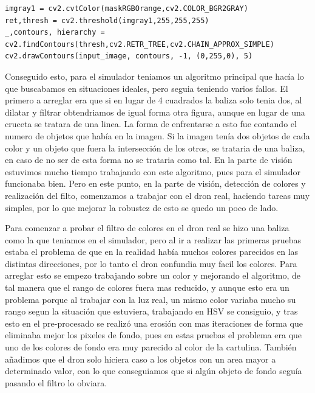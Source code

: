 \begin{verbatim}
imgray1 = cv2.cvtColor(maskRGBOrange,cv2.COLOR_BGR2GRAY)
ret,thresh = cv2.threshold(imgray1,255,255,255)
_,contours, hierarchy = cv2.findContours(thresh,cv2.RETR_TREE,cv2.CHAIN_APPROX_SIMPLE)
cv2.drawContours(input_image, contours, -1, (0,255,0), 5)
\end{verbatim}

\hspace{1cm}Conseguido esto, para el simulador teniamos un algoritmo principal que hac\'ia lo que buscabamos en situaciones ideales, pero seguia teniendo varios fallos.
\hspace{1cm} El primero a arreglar era que si en lugar de 4 cuadrados la baliza solo tenia dos, al dilatar y filtrar obtendriamos de igual forma otra figura, aunque en lugar de una cruceta se tratara de una linea. La forma de enfrentarse a esto fue contando el numero de objetos que hab\'ia en la imagen. Si la imagen ten\'ia dos objetos de cada color y un objeto que fuera la intersecci\'on de los otros, se trataria de una baliza, en caso de no ser de esta forma no se trataria como tal. En la parte de visi\'on estuvimos mucho tiempo trabajando con este algoritmo, pues para el simulador funcionaba bien. Pero en este punto, en la parte de visi\'on, detecci\'on de colores y realizaci\'on del filto, comenzamos a trabajar con el dron real, haciendo tareas muy simples, por lo que mejorar la robustez de esto se quedo un poco de lado. 

\hspace{1cm} Para comenzar a probar el filtro de colores en el dron real se hizo una baliza como la que teniamos en el simulador, pero al ir a realizar las primeras pruebas estaba el problema de que en la realidad hab\'ia muchos colores parecidos en las distintas direcciones, por lo tanto el dron confundia muy facil los colores. Para arreglar esto se empezo trabajando sobre un color y mejorando el algoritmo, de tal manera que el rango de colores fuera mas reducido, y aunque esto era un problema porque al trabajar con la luz real, un mismo color variaba mucho su rango segun la situaci\'on que estuviera, trabajando en HSV se consiguio, y tras esto en el pre-procesado se realiz\'o una erosi\'on con mas iteraciones de forma que eliminaba mejor los pixeles de fondo, pues en estas pruebas el problema era que uno de los colores de fondo era muy parecido al color de la cartulina. Tambi\'en añadimos que el dron solo hiciera caso a los objetos con un area mayor a determinado valor, con lo que conseguiamos que si alg\'un objeto de fondo segu\'ia pasando el filtro lo obviara.

